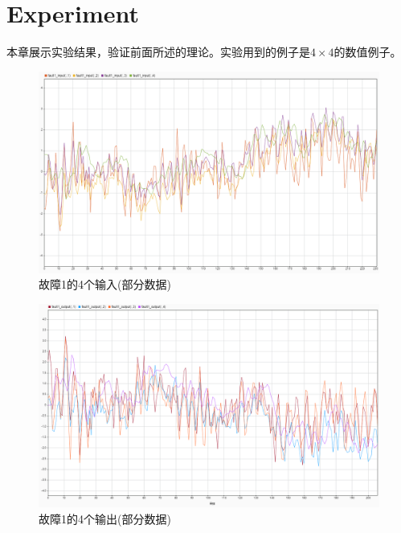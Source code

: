 \documentclass[lang=cn,11pt,a4paper]{elegantpaper}
\begin{document}
\section{Experiment}
本章展示实验结果，验证前面所述的理论。实验用到的例子是$4\times 4$的数值例子。
\begin{figure}[H] %
	\centering %
	\includegraphics[width=1.0\textwidth]{fault1_input} %
	\caption{故障1的4个输入(部分数据)} %
	\label{Fig.main2} %
\end{figure}
\begin{figure}[H] %
	\centering %
	\includegraphics[width=1.0\textwidth]{fault1_output} %
	\caption{故障1的4个输出(部分数据)} %
	\label{Fig.main2} %
\end{figure}
\end{document}

